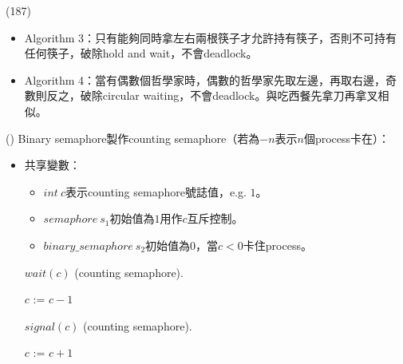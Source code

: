 \begin{theorem}{(187)}
\begin{itemize}
\begin{itemize}
\begin{algorithm}[H]
\begin{algorithmic}[1]
                    \EndFunction
                \end{algorithmic}
            \end{algorithm}
        \end{itemize}
        \item Algorithm 3：只有能夠同時拿左右兩根筷子才允許持有筷子，否則不可持有任何筷子，破除hold and wait，不會deadlock。
        \item Algorithm 4：當有偶數個哲學家時，偶數的哲學家先取左邊，再取右邊，奇數則反之，破除circular waiting，不會deadlock。與吃西餐先拿刀再拿叉相似。
    \end{itemize}
\end{theorem}

\begin{theorem}{()} Binary semaphore製作counting semaphore（若為$-n$表示$n$個process卡在）：\begin{itemize}
        \item 共享變數：\begin{itemize}
            \item $int \ c$表示counting semaphore號誌值，e.g. $1$。
            \item $semaphore \ s_1$初始值為$1$用作$c$互斥控制。
            \item $binary\_semaphore \ s_2$初始值為$0$，當$c < 0$卡住process。
        \end{itemize}
        \begin{algorithm}[H]
            \caption{$wait(c)$ (counting semaphore).}
            \begin{algorithmic}[1]
                    \State {}
                    \State $c$ := $c - 1$
                        \State {}
                        \State {} 
                    \Else
                        \State {}
                    \EndIf
                \EndFunction
            \end{algorithmic}
        \end{algorithm}
        \begin{algorithm}[H]
            \caption{$signal(c)$ (counting semaphore).}
            \begin{algorithmic}[1]
                    \State {}
                    \State $c$ := $c + 1$
                     
                        \State {}
                    \EndIf
                    \State {}
                \EndFunction
            \end{algorithmic}
        \end{algorithm}
    \end{itemize}
\end{theorem}

